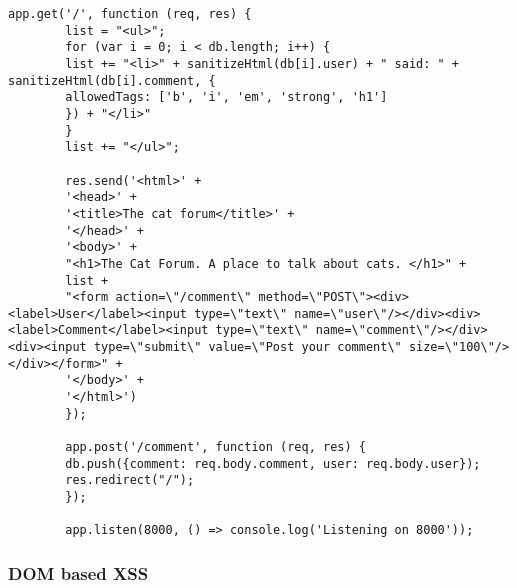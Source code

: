 \begin{Answer}[ref={websec-xss-prevention}]
\begin{lstlisting}[style=JavaScript]
		app.get('/', function (req, res) {
		list = "<ul>";
		for (var i = 0; i < db.length; i++) {
		list += "<li>" + sanitizeHtml(db[i].user) + " said: " + sanitizeHtml(db[i].comment, {
		allowedTags: ['b', 'i', 'em', 'strong', 'h1']
		}) + "</li>"
		}
		list += "</ul>";
		
		res.send('<html>' +
		'<head>' +
		'<title>The cat forum</title>' +
		'</head>' +
		'<body>' +
		"<h1>The Cat Forum. A place to talk about cats. </h1>" +
		list +
		"<form action=\"/comment\" method=\"POST\"><div><label>User</label><input type=\"text\" name=\"user\"/></div><div><label>Comment</label><input type=\"text\" name=\"comment\"/></div><div><input type=\"submit\" value=\"Post your comment\" size=\"100\"/></div></form>" +
		'</body>' +
		'</html>')
		});
		
		app.post('/comment', function (req, res) {
		db.push({comment: req.body.comment, user: req.body.user});
		res.redirect("/");
		});
		
		app.listen(8000, () => console.log('Listening on 8000'));
		\end{lstlisting}
	\subsubsection{DOM based XSS}
	\begin{lstlisting}[style=JavaScript]
	\end{lstlisting}
\end{Answer}